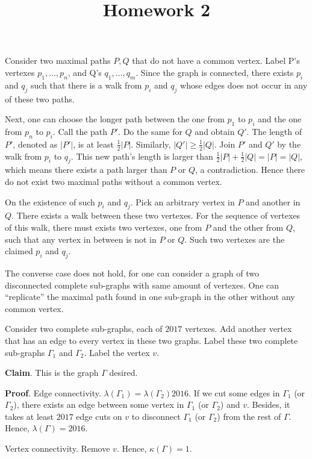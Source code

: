 \documentclass{homework}
\title{Homework 2}
\begin{document}
\maketitle

\begin{problem}{1}
Consider two maximal paths $P, Q$ that do not have a common vertex. Label P's
vertexes $p_1, \hdots, p_n$, and Q's $q_1, \hdots, q_m$. Since the graph
is connected, there exists $p_i$ and $q_j$ such that there is a walk from
$p_i$ and $q_j$ whose edges does not occur in any of these two paths.

Next, one can choose the longer path between the one from $p_1$ to $p_i$
and the one from $p_n$ to $p_i$. Call the path $P'$. Do the same for $Q$ and
obtain $Q'$. The length of $P'$, denoted as $|P'|$, is at least
$\frac{1}{2}|P|$. Similarly, $|Q'| \geq \frac{1}{2}|Q|$. Join $P'$ and $Q'$
by the walk from $p_i$ to $q_j$. This new path's length is larger than
$\frac{1}{2}|P| + \frac{1}{2}|Q| = |P| = |Q|$, which means there exists a
path larger than $P$ or $Q$, a contradiction. Hence there do not exist
two maximal paths without a common vertex.

On the existence of such $p_i$ and $q_j$. Pick an arbitrary vertex in $P$
and another in $Q$. There exists a walk between these two vertexes. For
the sequence of vertexes of this walk, there must exists two vertexes, one
from $P$ and the other from $Q$, such that any vertex in between is not
in $P$ or $Q$. Such two vertexes are the claimed $p_i$ and $q_j$. \QED

The converse case does not hold, for one can consider a graph of two
disconnected complete sub-graphs with same amount of vertexes. One can
``replicate'' the maximal path found in one sub-graph in the other without
any common vertex.
\end{problem}

\begin{problem}{2}
Consider two complete sub-graphs, each of $2017$ vertexes. Add another vertex
that has an edge to every vertex in these two graphs. Label these two complete 
sub-graphs $\Gamma_1$ and $\Gamma_2$. Label the vertex $v$.

\textbf{Claim}. This is the graph $\Gamma$ desired.

\textbf{Proof}. Edge connectivity. $\lambda(\Gamma_1) = \lambda(\Gamma_2) 2016$.
If we cut some edges in $\Gamma_1$ (or $\Gamma_2$), there exists an edge between
some vertex in $\Gamma_1$ (or $\Gamma_2$) and $v$. Besides, it takes at least
$2017$ edge cuts on $v$ to disconnect $\Gamma_1$ (or $\Gamma_2$) from the rest
of $\Gamma$. Hence, $\lambda(\Gamma) = 2016$.

Vertex connectivity. Remove $v$. Hence, $\kappa(\Gamma) = 1$. \QED
\end{problem}
\end{document}
